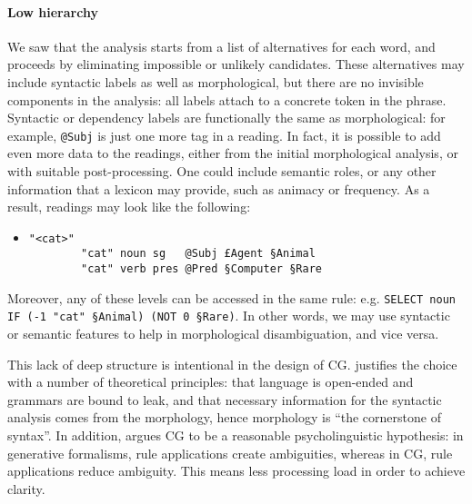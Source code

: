 \paragraph{Low hierarchy}


We saw that the analysis starts from a list of alternatives for each word, and proceeds by eliminating impossible or unlikely candidates.
These alternatives may include syntactic labels as well as morphological, but there are no invisible components in the analysis: all labels attach to a concrete token in the phrase.
Syntactic or dependency labels are functionally the same as morphological: for example, \texttt{@Subj} is just one more tag in a reading.
In fact, it is possible to add even more data to the readings, either from the initial morphological analysis, or with suitable post-processing. One could include semantic roles, or any other information that a lexicon may provide, such as animacy or frequency.
As a result, readings may look like the following:

\begin{itemize}
\item[] 
\begin{verbatim}
"<cat>"
        "cat" noun sg   @Subj £Agent §Animal
        "cat" verb pres @Pred §Computer §Rare
\end{verbatim}
\end{itemize}

\noindent Moreover, any of these levels can be accessed in the same rule: e.g. \texttt{SELECT noun IF (-1 "cat" §Animal) (NOT 0 §Rare)}. 
In other words, we may use syntactic or semantic features to help in morphological disambiguation, and vice versa.

This lack of deep structure is intentional in the design of CG.
\cite{karlsson1995constraint} justifies the choice with a number of
theoretical principles: that language is open-ended and grammars are
bound to leak, and that necessary information for the syntactic analysis
comes from the morphology, hence morphology is ``the cornerstone of
syntax''. 
In addition, \cite{karlsson1995constraint} argues CG to be a reasonable 
psycholinguistic hypothesis: 
in generative formalisms, rule applications create ambiguities,
whereas in CG, rule applications reduce ambiguity. This means less processing load 
in order to achieve clarity. 



